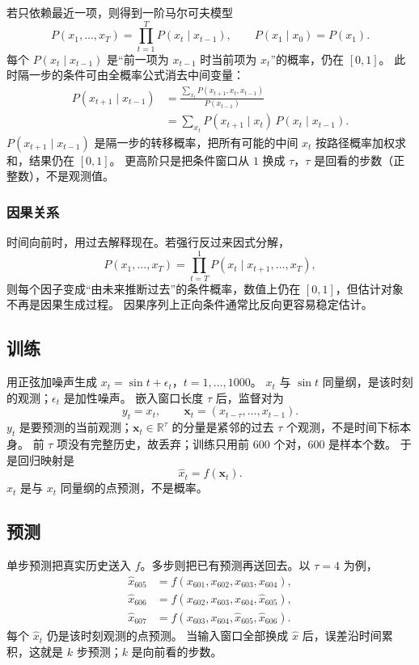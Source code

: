 若只依赖最近一项，则得到一阶马尔可夫模型
\[
P(x_1,\ldots,x_T)=\prod_{t=1}^{T}P(x_t \mid x_{t-1}),
\qquad
P(x_1 \mid x_0)=P(x_1).
\]
每个 $P(x_t \mid x_{t-1})$ 是“前一项为 $x_{t-1}$ 时当前项为 $x_t$”的概率，仍在 $[0,1]$。
此时隔一步的条件可由全概率公式消去中间变量：
\begin{align*}
P(x_{t+1} \mid x_{t-1})
&=
\frac{\sum_{x_t}P(x_{t+1},x_t,x_{t-1})}{P(x_{t-1})}
\\
&=
\sum_{x_t} P(x_{t+1} \mid x_t)\,P(x_t \mid x_{t-1}).
\end{align*}
$P(x_{t+1}\mid x_{t-1})$ 是隔一步的转移概率，把所有可能的中间 $x_t$ 按路径概率加权求和，结果仍在 $[0,1]$。
更高阶只是把条件窗口从 $1$ 换成 $\tau$，$\tau$ 是回看的步数（正整数），不是观测值。

\subsubsection{因果关系}

时间向前时，用过去解释现在。若强行反过来因式分解，
\[
P(x_1,\ldots,x_T)=\prod_{t=T}^{1}P(x_t \mid x_{t+1},\ldots,x_T),
\]
则每个因子变成“由未来推断过去”的条件概率，数值上仍在 $[0,1]$，但估计对象不再是因果生成过程。
因果序列上正向条件通常比反向更容易稳定估计。

\subsection{训练}

用正弦加噪声生成 $x_t=\sin t+\epsilon_t$，$t=1,\ldots,1000$。
$x_t$ 与 $\sin t$ 同量纲，是该时刻的观测；$\epsilon_t$ 是加性噪声。
嵌入窗口长度 $\tau$ 后，监督对为
\[
y_t=x_t,
\qquad
\bm{x}_t=(x_{t-\tau},\ldots,x_{t-1}).
\]
$y_t$ 是要预测的当前观测；$\bm{x}_t\in\mathbb{R}^{\tau}$ 的分量是紧邻的过去 $\tau$ 个观测，不是时间下标本身。
前 $\tau$ 项没有完整历史，故丢弃；训练只用前 $600$ 个对，$600$ 是样本个数。
于是回归映射是
\[
\hat{x}_t=f(\bm{x}_t).
\]
$\hat{x}_t$ 是与 $x_t$ 同量纲的点预测，不是概率。

\subsection{预测}

单步预测把真实历史送入 $f$。多步则把已有预测再送回去。以 $\tau=4$ 为例，
\begin{align*}
\hat{x}_{605}&=f(x_{601},x_{602},x_{603},x_{604}),
\\
\hat{x}_{606}&=f(x_{602},x_{603},x_{604},\hat{x}_{605}),
\\
\hat{x}_{607}&=f(x_{603},x_{604},\hat{x}_{605},\hat{x}_{606}).
\end{align*}
每个 $\hat{x}_{t}$ 仍是该时刻观测的点预测。
当输入窗口全部换成 $\hat{x}$ 后，误差沿时间累积，这就是 $k$ 步预测；$k$ 是向前看的步数。

